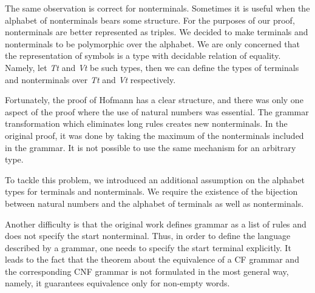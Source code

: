 The same observation is correct for nonterminals.
Sometimes it is useful when the alphabet of nonterminals bears some structure.
For the purposes of our proof, nonterminals are better represented as triples.
We decided to make terminals and nonterminals to be polymorphic over the alphabet.
We are only concerned that the representation of symbols is a type with decidable relation of equality.
Namely, let \textit{Tt} and \textit{Vt} be such types, then we can define the types of terminals and nonterminals over \textit{Tt} and \textit{Vt} respectively.


Fortunately, the proof of Hofmann has a clear structure, and there was only one aspect of the proof where the use of natural numbers was essential. The grammar transformation which eliminates long rules creates new nonterminals. In the original proof, it was done by taking the maximum of the nonterminals included in the grammar.
It is not possible to use the same mechanism for an arbitrary type.

To tackle this problem, we introduced an additional assumption on the alphabet types for terminals and nonterminals. We require the existence of the bijection between natural numbers and the alphabet of terminals as well as nonterminals.

Another difficulty is that the original work defines grammar as a list of rules and does not specify the start nonterminal. Thus, in order to define the language described by a  grammar, one needs to specify the start terminal explicitly. It leads to the fact that the theorem about the equivalence of a CF grammar and the corresponding CNF grammar is not formulated in the most general way, namely, it guarantees equivalence only for non-empty words.


